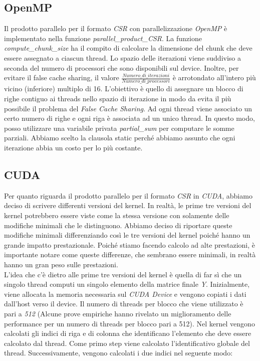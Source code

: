 \documentclass{article}
\begin{document}
\subsection{OpenMP}
Il prodotto parallelo per il formato \textit{CSR} con parallelizzazione \textit{OpenMP} è implementato nella funzione \textit{parallel\_product\_CSR}. La funzione \textit{compute\_chunk\_size} ha il compito di calcolare la dimensione del chunk che deve essere assegnato a ciascun thread. Lo spazio delle iterazioni viene suddiviso a seconda del numero di processori che sono disponibili sul device. 
Inoltre, per evitare il false cache sharing, il valore $ \frac {Numero\_di\_iterazioni} {Numero\_di\_processori} $ è arrotondato all'intero più vicino (inferiore) multiplo di 16.
L'obiettivo è quello di assegnare un blocco di righe contiguo ai threads nello spazio di iterazione in modo da evita il più possibile il problema del \textit{False Cache Sharing}. Ad ogni thread viene associato un certo numero di righe e ogni riga è associata ad un unico thread. In questo modo, posso utilizzare una variabile privata \textit{partial\_sum} per computare le somme parziali. Abbiamo scelto la clausola static perché abbiamo assunto che ogni iterazione abbia un costo per lo più costante.

\subsection{CUDA}
Per quanto riguarda il prodotto parallelo per il formato \textit{CSR} in \textit{CUDA}, abbiamo deciso di scrivere differenti versioni del kernel. In realtà, le prime tre versioni del kernel potrebbero essere viste come la stessa versione con solamente delle modifiche minimali che le distinguono. Abbiamo deciso di riportare queste modifiche minimali differenziando così le tre versioni del kernel poiché hanno un grande impatto prestazionale. Poiché stiamo facendo calcolo ad alte prestazioni, è importante notare come queste differenze, che sembrano essere minimali, in realtà hanno un gran peso sulle prestazioni.\\
L'idea che c'è dietro alle prime tre versioni del kernel è quella di far sì che un singolo thread computi un singolo elemento della matrice finale \textit{Y}. Inizialmente, viene allocata la memoria necessaria sul \textit{CUDA Device} e vengono copiati i dati dall'host verso il device. Il numero di threads per blocco che viene utilizzato è pari a \textit{512} (Alcune prove empiriche hanno rivelato un miglioramento delle performance per un numero di threads per blocco pari a 512). Nel kernel vengono calcolati gli indici di riga e di colonna che identificano l'elemento che deve essere calcolato dal thread. Come primo step viene calcolato l'identificativo globale del thread. Successivamente, vengono calcolati i due indici nel seguente modo:
\end{document}
